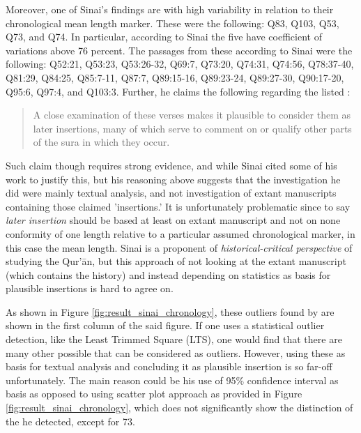 Moreover, one of Sinai's findings are   with high variability in relation to their chronological mean   length marker. These   were the following: Q83, Q103, Q53, Q73, and Q74. In particular, according to Sinai the five   have coefficient of variations above 76 percent. The passages from these   according to Sinai were the following: Q52:21, Q53:23, Q53:26-32, Q69:7, Q73:20, Q74:31, Q74:56, Q78:37-40, Q81:29, Q84:25, Q85:7-11, Q87:7, Q89:15-16, Q89:23-24, Q89:27-30, Q90:17-20, Q95:6, Q97:4, and Q103:3. Further, he claims the following regarding the listed  :
\begin{quotation}
    A close examination of these verses makes it plausible to consider them as later insertions, many of which serve to comment on or qualify other parts of the sura in which they occur.
\end{quotation}

Such claim though requires strong evidence, and while Sinai cited some of his work to justify this, but his reasoning above suggests that the investigation he did were mainly textual analysis, and not investigation of extant manuscripts containing those claimed 'insertions.' It is unfortunately problematic since to say \textit{later insertion} should be based at least on extant manuscript and not on none conformity of one   length relative to a particular assumed chronological marker, in this case the mean   length. Sinai is a proponent of \textit{historical-critical perspective} of studying the Qur'\=an, but this approach of not looking at the extant manuscript (which contains the history) and instead depending on statistics as basis for plausible insertions is hard to agree on.

As shown in Figure \ref{fig:result_sinai_chronology}, these outliers found by \cite{sinai2020oqs} are shown in the first column of the said figure. If one uses a statistical outlier detection, like the Least Trimmed Square (LTS), one would find that there are many other possible   that can be considered as outliers. However, using these as basis for textual analysis and concluding it as plausible insertion is so far-off unfortunately. The main reason could be his use of 95\% confidence interval as basis as opposed to using scatter plot approach as provided in Figure \ref{fig:result_sinai_chronology}, which does not significantly show the distinction of the   he detected, except for   73.

